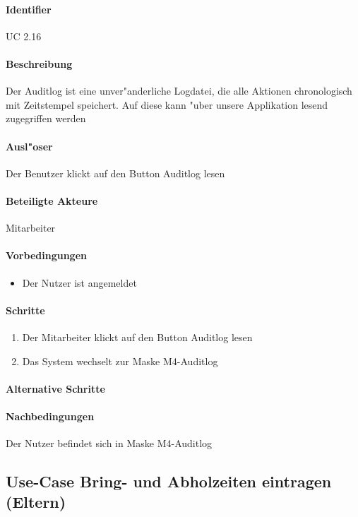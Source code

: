   \paragraph{Identifier}
  UC 2.16
  \paragraph{Beschreibung}
  Der Auditlog ist eine unver"anderliche Logdatei, die alle Aktionen chronologisch mit Zeitstempel speichert. Auf diese kann "uber unsere Applikation lesend zugegriffen werden 
  \paragraph{Ausl"oser}
  Der Benutzer klickt auf den Button \dq Auditlog lesen\dq
  \paragraph{Beteiligte Akteure}   \leavevmode \newline
    Mitarbeiter
  \paragraph{Vorbedingungen}
  \begin{itemize}
   \item Der Nutzer ist angemeldet
  \end{itemize}

  \paragraph{Schritte}
  \begin{enumerate}
   \item Der Mitarbeiter klickt auf den Button \dq Auditlog lesen\dq
   \item Das System wechselt zur Maske M4-Auditlog
  \end{enumerate}
  \paragraph{Alternative Schritte}
  \paragraph{Nachbedingungen}
  Der Nutzer befindet sich in Maske M4-Auditlog

  
  \newpage
 \subsection{Use-Case Bring- und Abholzeiten eintragen (Eltern)}
